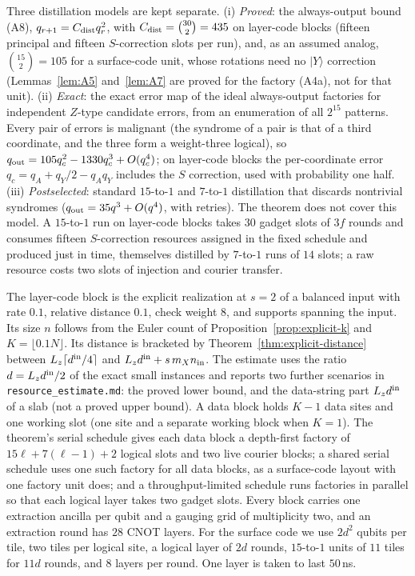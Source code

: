 \documentclass[aps,prx,reprint,superscriptaddress,nofootinbib,floatfix,longbibliography]{revtex4-2}
\theoremstyle{definition}
\begin{document}
Three distillation models are kept separate.  (i) \emph{Proved}: the
always-output bound (A8), $q_{r+1}=C_{\rm dist}q_r^2$, with
$C_{\rm dist}=\binom{30}{2}=435$ on layer-code blocks (fifteen principal and
fifteen $S$-correction slots per run), and, as an assumed analog,
$\binom{15}{2}=105$ for a surface-code unit, whose rotations need no
$|Y\rangle$ correction (Lemmas~\ref{lem:A5} and~\ref{lem:A7} are proved for
the factory (A4a), not for that unit).
(ii) \emph{Exact}: the exact error map of the ideal always-output factories
for independent $Z$-type candidate errors, from an enumeration of all
$2^{15}$ patterns.  Every pair of errors is malignant (the syndrome of a pair
is that of a third coordinate, and the three form a weight-three logical), so
$q_{\rm out}=105q_c^2-1330q_c^3+O(q_c^4)$; on layer-code blocks the
per-coordinate error $q_c=q_A+q_Y/2-q_Aq_Y$ includes the $S$ correction, used
with probability one half.  (iii) \emph{Postselected}: standard $15$-to-$1$
and $7$-to-$1$ distillation that discards nontrivial syndromes
($q_{\rm out}=35q^3+O(q^4)$, with retries).  The theorem does not cover this
model.  A $15$-to-$1$ run on layer-code blocks takes $30$ gadget slots of $3f$
rounds and consumes fifteen $S$-correction resources assigned in the fixed
schedule and produced just in time, themselves distilled by $7$-to-$1$ runs
of $14$ slots; a raw resource costs two slots of
injection and courier transfer.

The layer-code block is the explicit realization at $s=2$ of a balanced input
with rate $0.1$, relative distance $0.1$, check weight $8$, and supports
spanning the input.  Its size $n$ follows from the Euler count of
Proposition~\ref{prop:explicit-k} and $K=\lfloor0.1N\rfloor$.  Its distance is
bracketed by Theorem~\ref{thm:explicit-distance} between
$L_z\lceil d^{\rm in}/4\rceil$ and $L_zd^{\rm in}+s\,m_Xn_{\rm in}$.  The
estimate uses the ratio $d=L_zd^{\rm in}/2$ of the exact small instances and
reports two further scenarios in \nolinkurl{resource_estimate.md}: the proved
lower bound, and the data-string part $L_zd^{\rm in}$ of a slab (not a proved
upper bound).  A data block holds $K-1$
data sites and one working slot (one site and a separate working block when
$K=1$).  The theorem's serial schedule gives each data block a depth-first
factory of $15\ell+7(\ell-1)+2$ logical slots and two live courier blocks; a
shared serial schedule uses one such factory for all data blocks, as a
surface-code layout with one factory unit does; and a throughput-limited
schedule runs factories in parallel so that each logical layer takes two
gadget slots.  Every block carries one extraction ancilla per qubit and a
gauging grid of multiplicity two, and an extraction round has $28$ CNOT
layers.  For the surface code we use $2d^2$ qubits per tile, two tiles per
logical site, a logical layer of $2d$ rounds, $15$-to-$1$ units of $11$ tiles
for $11d$ rounds, and $8$ layers per round.  One layer is taken to last
$50$\,ns.
\end{document}
